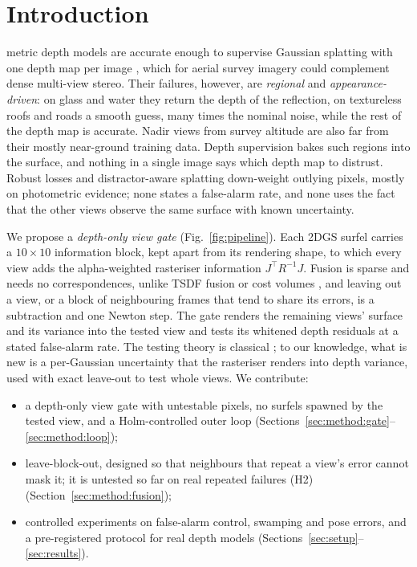\section{Introduction}
\label{sec:intro}

 metric depth models \cite{est_metric3dv2,est_unidepth,est_depthpro} are accurate
enough to supervise Gaussian splatting with one depth map per image \cite{gs_3dgs,gs_2dgs,gs_dnsplatter},
which for aerial survey imagery could complement dense multi-view stereo. Their failures, however, are
\emph{regional} and \emph{appearance-driven}: on glass and water they return the depth of the reflection,
on textureless roofs and roads a smooth guess, many times the nominal noise, while the rest of the depth map
is accurate. Nadir views from survey altitude are also far from their mostly near-ground training data.
Depth supervision bakes such regions into the surface, and nothing in a single image says which depth map
to distrust. Robust losses \cite{rob_blackrangarajan,rob_barron} and distractor-aware splatting
\cite{gs_robustnerf,gs_spotless} down-weight outlying pixels, mostly on photometric evidence; none states a
false-alarm rate, and none uses the fact that the other views observe the same surface with known
uncertainty.

We propose a \emph{depth-only view gate} (Fig.~\ref{fig:pipeline}). Each 2DGS surfel carries a
$10\times10$ information block, kept apart from its rendering shape, to which every view adds the
alpha-weighted rasteriser information $J^{\top}R^{-1}J$. Fusion is sparse and needs no correspondences,
unlike TSDF fusion \cite{fus_curless,fus_kinectfusion} or cost volumes \cite{rec_mvsnet}, and leaving out a
view, or a block of neighbouring frames that tend to share its errors, is a subtraction and one Newton
step. The gate renders the remaining views' surface and its variance into the tested view and tests its
whitened depth residuals at a stated false-alarm rate. The testing theory is classical
\cite{stat_teunissen_dia,flt_raim_joerger}; to our knowledge, what is new is a per-Gaussian uncertainty that
the rasteriser renders into depth variance, used with exact leave-out to test whole views. We contribute:
\begin{itemize}
  \item a depth-only view gate with untestable pixels, no surfels spawned by the tested view, and a
        Holm-controlled outer loop (Sections~\ref{sec:method:gate}--\ref{sec:method:loop});
  \item leave-block-out, designed so that neighbours that repeat a view's error cannot mask it; it is
        untested so far on real repeated failures (H2) (Section~\ref{sec:method:fusion});
  \item controlled experiments on false-alarm control, swamping and pose errors, and a pre-registered
        protocol for real depth models (Sections~\ref{sec:setup}--\ref{sec:results}).
\end{itemize}
